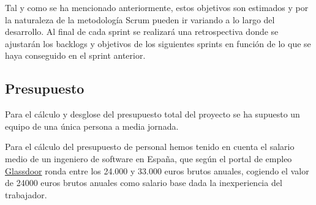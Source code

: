 Tal y como se ha mencionado anteriormente, estos objetivos son estimados y por la naturaleza de la metodología Scrum pueden ir variando a lo largo del desarrollo. Al final de cada sprint se realizará una retrospectiva donde se ajustarán los backlogs y objetivos de los siguientes sprints en función de lo que se haya conseguido en el sprint anterior.

\subsection{Presupuesto}
\label{sec:presupuesto}
Para el cálculo y desglose del presupuesto total del proyecto se ha supuesto un equipo de una única persona a media jornada.

Para el cálculo del presupuesto de personal hemos tenido en cuenta el salario medio de un ingeniero de software en España, que según el portal de empleo \href{https://www.glassdoor.es/Sueldos/granada-software-engineer-sueldo-SRCH_IL.0,7_IC2614045_KO8,25.htm}{Glassdoor} ronda entre los 24.000 y 33.000 euros brutos anuales, cogiendo el valor de 24000 euros brutos anuales como salario base dada la inexperiencia del trabajador.

